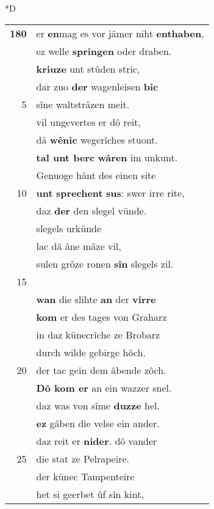 \documentclass[8pt,a4paper,notitlepage]{article}
\begin{document}
\begin{table}[ht]
\begin{minipage}[t]{0.5\linewidth}
\small
\begin{center}*D
\end{center}
\begin{tabular}{rl}
\textbf{180} & er \textbf{en}mag es vor jâmer niht \textbf{enthaben},\\ 
 & ez welle \textbf{springen} oder draben.\\ 
 & \textbf{kriuze} unt stûden stric,\\ 
 & dar zuo \textbf{der} wagenleisen \textbf{bic}\\ 
5 & sîne waltstrâzen meit.\\ 
 & vil ungevertes er dô reit,\\ 
 & dâ \textbf{wênic} wegerîches stuont.\\ 
 & \textbf{tal unt berc} \textbf{wâren} im unkunt.\\ 
 & Genuoge hânt des einen site\\ 
10 & \textbf{unt} \textbf{sprechent} \textbf{sus}: swer irre rite,\\ 
 & daz \textbf{der} den slegel vünde.\\ 
 & slegels urkünde\\ 
 & lac dâ âne mâze vil,\\ 
 & sulen grôze ronen \textbf{sîn} slegels zil.\\ 
15 & \textbf{\begin{large}D\end{large}och} reit er \textbf{wênec} \textbf{irre},\\ 
 & \textbf{wan} die slihte \textbf{an} der \textbf{virre}\\ 
 & \textbf{kom} er des tages von Graharz\\ 
 & in daz künecrîche ze Brobarz\\ 
 & durch wilde gebirge hôch.\\ 
20 & der tac gein dem âbende zôch.\\ 
 & \textbf{Dô kom er} an ein wazzer snel.\\ 
 & daz was von sîme \textbf{duzze} hel.\\ 
 & \textbf{ez} gâben die velse ein ander.\\ 
 & daz reit er \textbf{nider}. dô vander\\ 
25 & die stat ze Pelrapeire.\\ 
 & der künec Tampenteire\\ 
 & het si geerbet ûf sîn kint,\\ 

\end{tabular}
\end{minipage}
\end{table}
\end{document}
